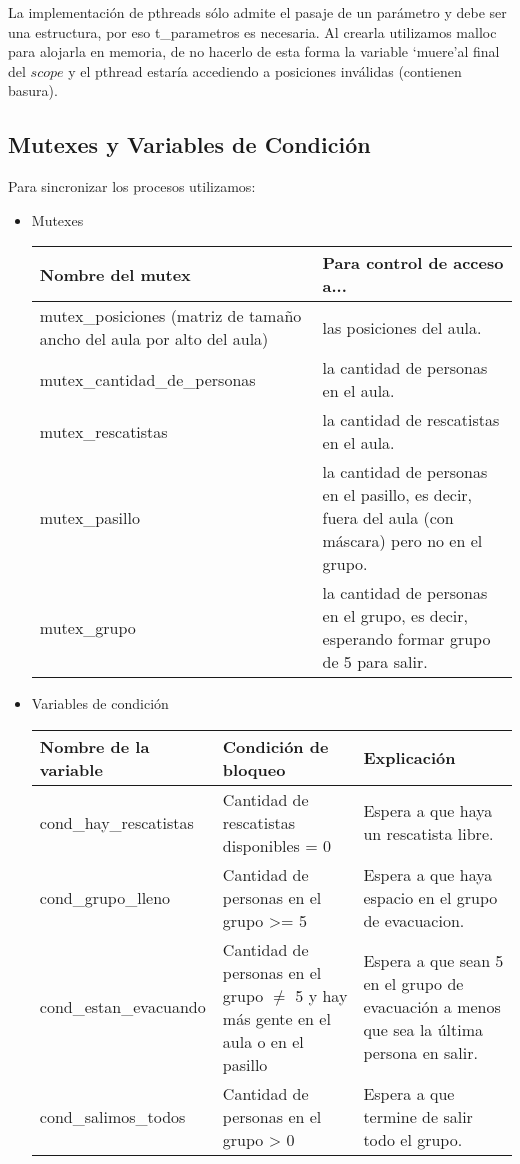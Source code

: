 La implementación de pthreads sólo admite el pasaje de un parámetro y debe
ser una estructura, por eso t\_parametros es necesaria. Al crearla utilizamos malloc para alojarla en memoria, 
de no hacerlo de esta forma la variable \textquoteleft muere\textquoteright al final del $scope$ y
el pthread estaría accediendo a posiciones inválidas (contienen basura).

\subsection{Mutexes y Variables de Condición}
Para sincronizar los procesos utilizamos:

\begin{itemize}
\item Mutexes
  \medskip

  \begin{tabular}{|p{7.5cm}|p{9cm}|}
  \hline
  Nombre del mutex & Para control de acceso a... \\
  \hline
  mutex\_posiciones (matriz de tamaño ancho del aula por alto del aula) & las posiciones del aula. \\
  \hline
  mutex\_cantidad\_de\_personas & la cantidad de personas en el aula. \\
  \hline
  mutex\_rescatistas & la cantidad de rescatistas en el aula. \\
  \hline
  mutex\_pasillo & la cantidad de personas en el pasillo, es decir, fuera del aula (con máscara) pero no en el grupo. \\
  \hline
  mutex\_grupo & la cantidad de personas en el grupo, es decir, esperando formar grupo de 5 para salir. \\
  \hline
  \end{tabular}

\item Variables de condición
  \medskip

  \begin{tabular}{|l|p{5cm}|p{7cm}|}
  \hline
  Nombre de la variable & Condición de bloqueo & Explicación  \\
  \hline
  cond\_hay\_rescatistas & Cantidad de rescatistas disponibles = 0 & Espera a que haya un rescatista libre. \\ %
  \hline
  cond\_grupo\_lleno & Cantidad de personas en el grupo >= 5 & Espera a que haya espacio en el grupo de evacuacion. \\ %
  \hline
  cond\_estan\_evacuando & Cantidad de personas en el grupo $\neq$ 5 y hay más gente en el aula o en el pasillo & Espera a que sean 5 en el grupo de 
    evacuación a menos que sea la última persona en salir. \\ %
  \hline
  cond\_salimos\_todos & Cantidad de personas en el grupo > 0 & Espera a que termine de salir todo el grupo. \\ %
  \hline
  \end{tabular}

\end{itemize}

